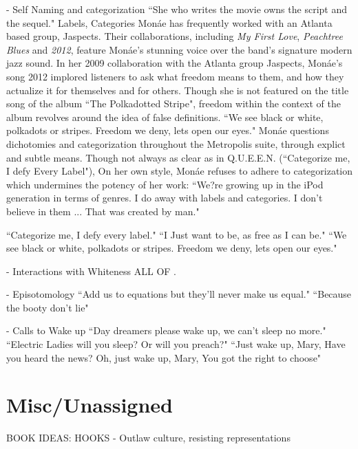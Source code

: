 \documentclass[a4paper, 11pt]{article} %
\begin{document}
- Self Naming and categorization
``She who writes the movie owns the script and the sequel."\cite{queen}
Labels, Categories
Mon\'ae has frequently worked with an Atlanta based group, Jaspects.
Their collaborations, including \emph{My First Love}, \emph{Peachtree Blues} and \emph{2012}, feature Mon\'ae's stunning voice over the band's signature modern jazz sound\cite{peachtreeblues}\cite{mytruelove}.
In her 2009 collaboration with the Atlanta group Jaspects, Mon\'ae's song 2012 implored listeners to ask what freedom means to them, and how they actualize it for themselves and for others.
Though she is not featured on the title song of the album ``The Polkadotted Stripe", freedom within the context of the album revolves around the idea of false definitions.
``We see black or white, polkadots or stripes. Freedom we deny, lets open our eyes."\cite{polkadottedstripe}
Mon\'ae questions dichotomies and categorization throughout the Metropolis suite, through explict and subtle means.
Though not always as clear as in Q.U.E.E.N. (``Categorize me, I defy Every Label"\cite{queen}), 
On her own style, Mon\'ae refuses to adhere to categorization which undermines the potency of her work:
``We?re growing up in the iPod generation in terms of genres. I do away with labels and categories. I don't believe in them ... That was created by man."\cite{joeyguerra2010}


``Categorize me, I defy every label."\cite{queen}
``I Just want to be, as free as I can be."\cite{polkadottedstripe}
``We see black or white, polkadots or stripes. Freedom we deny, lets open our eyes."\cite{polkadottedstripe}

- Interactions with Whiteness
ALL OF \cite{favoritefugitive}.

- Episotomology
``Add us to equations but they'll never make us equal."\cite{queen}
``Because the booty don't lie"\cite{queen}

- Calls to Wake up
``Day dreamers please wake up, we can't sleep no more."\cite{sincerelyjane}
``Electric Ladies will you sleep? Or will you preach?"\cite{queen}
``Just wake up, Mary, Have you heard the news? Oh, just wake up, Mary, You got the right to choose"\cite{sallyride}




\section*{Misc/Unassigned}

BOOK IDEAS:
HOOKS - Outlaw culture, resisting representations



\nocite{*}
{}


\end{document}
